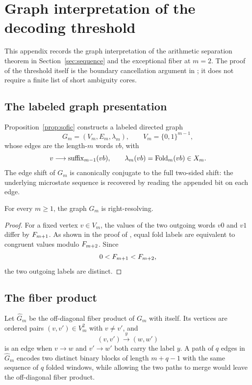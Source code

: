 \section{Graph interpretation of the decoding threshold}
\label{app:sofic}

This appendix records the graph interpretation of the arithmetic separation theorem in Section~\ref{sec:sequence} and the exceptional fiber at $m=2$. The proof of the threshold itself is the boundary cancellation argument in ; it does not require a finite list of short ambiguity cores.

\subsection{The labeled graph presentation}

Proposition~\ref{prop:sofic} constructs a labeled directed graph
\[
G_m=(V_m,E_m,\lambda_m),
\qquad
V_m=\{0,1\}^{m-1},
\]
whose edges are the length-$m$ words $vb$, with
\[
v\longrightarrow \operatorname{suffix}_{m-1}(vb),
\qquad
\lambda_m(vb)=\mathrm{Fold}_m(vb)\in X_m.
\]
The edge shift of $G_m$ is canonically conjugate to the full two-sided shift: the underlying microstate sequence is recovered by reading the appended bit on each edge.

\begin{proposition}\label{prop:right-resolving}
For every $m\ge1$, the graph $G_m$ is right-resolving.
\end{proposition}

\begin{proof}
For a fixed vertex $v\in V_m$, the values of the two outgoing words $v0$ and $v1$ differ by $F_{m+1}$. As shown in the proof of , equal fold labels are equivalent to congruent values modulo $F_{m+2}$. Since
\[
0<F_{m+1}<F_{m+2},
\]
the two outgoing labels are distinct.
\end{proof}

\subsection{The fiber product}

Let $\widehat G_m$ be the off-diagonal fiber product of $G_m$ with itself. Its vertices are ordered pairs $(v,v')\in V_m^2$ with $v\ne v'$, and
\[
(v,v')\xrightarrow{y}(w,w')
\]
is an edge when $v\to w$ and $v'\to w'$ both carry the label $y$. A path of $q$ edges in $\widehat G_m$ encodes two distinct binary blocks of length $m+q-1$ with the same sequence of $q$ folded windows, while allowing the two paths to merge would leave the off-diagonal fiber product.

